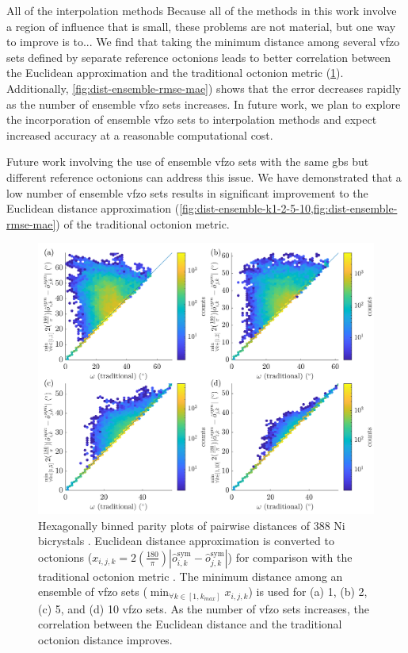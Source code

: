 \documentclass[final,twocolumn,12pt]{elsarticle}
\begin{document}
All of the interpolation methods Because all of the methods in this work involve a region of influence that is small, these problems are not material, but one way to improve is to... We find that taking the minimum distance among several \gls{vfzo} sets defined by separate reference octonions leads to better correlation between the Euclidean approximation and the traditional octonion metric (\cref{fig:dist-ensemble-k1-2-5-10}). Additionally, \cref{fig:dist-ensemble-rmse-mae}) shows that the error decreases rapidly as the number of ensemble \gls{vfzo} sets increases. In future work, we plan to explore the incorporation of ensemble \gls{vfzo} sets to interpolation methods and expect increased accuracy at a reasonable computational cost.

Future work involving the use of ensemble \gls{vfzo} sets with the same \glspl{gb} but different reference octonions can address this issue. We have demonstrated that a low number of ensemble \gls{vfzo} sets results in significant improvement to the Euclidean distance approximation (\cref{fig:dist-ensemble-k1-2-5-10,fig:dist-ensemble-rmse-mae}) of the traditional octonion metric.

\begin{figure}
    \centering
    \includegraphics[scale=1]{figures/dist-ensemble-k1-2-5-10.png}
    \caption{Hexagonally binned parity plots of pairwise distances of 388 Ni bicrystals \cite{olmstedSurveyComputedGrain2009a}. Euclidean distance approximation is converted to octonions ($x_{i,j,k}=2\left(\frac{180}{\pi}\right)|\hat{o}_{i,k}^{\text{sym}}-\hat{o}_{j,k}^{\text{sym}}|$) for comparison with the traditional octonion metric \cite{chesserLearningGrainBoundary2020}. The minimum distance among an ensemble of \gls{vfzo} sets ($\min_{\forall k \in [1,k_{max}]}x_{i,j,k}$) is used for (a) 1, (b) 2, (c) 5, and (d) 10 \gls{vfzo} sets. As the number of \gls{vfzo} sets increases, the correlation between the Euclidean distance and the traditional octonion distance improves.}
    \label{fig:dist-ensemble-k1-2-5-10}
\end{figure}
\end{document}

